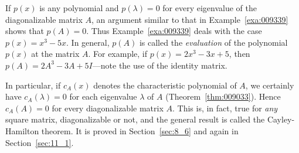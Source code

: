 If $p(x)$ is any polynomial and $p(\lambda) = 0$ for every eigenvalue of the diagonalizable matrix $A$, an argument similar to that in Example~\ref{exa:009339} shows that $p(A) = 0$. Thus Example~\ref{exa:009339} deals with the case $p(x) = x^{3} - 5x$. In general, $p(A)$ is called the \textit{evaluation} of the polynomial $p(x)$ at the matrix $A$. For example, if $p(x) = 2x^{3} - 3x + 5$, then $p(A) = 2A^{3} - 3A + 5I$---note the use of the identity matrix.


In particular, if $c_{A}(x)$ denotes the characteristic polynomial of $A$, we certainly have $c_{A}(\lambda) = 0$ for each eigenvalue $\lambda$ of $A$ (Theorem~\ref{thm:009033}). Hence $c_{A}(A) = 0$ for every diagonalizable matrix $A$. This is, in fact, true for \textit{any} square matrix, diagonalizable or not, and the general result is called the Cayley-Hamilton theorem. It is proved in Section~\ref{sec:8_6} and again in Section~\ref{sec:11_1}. 

